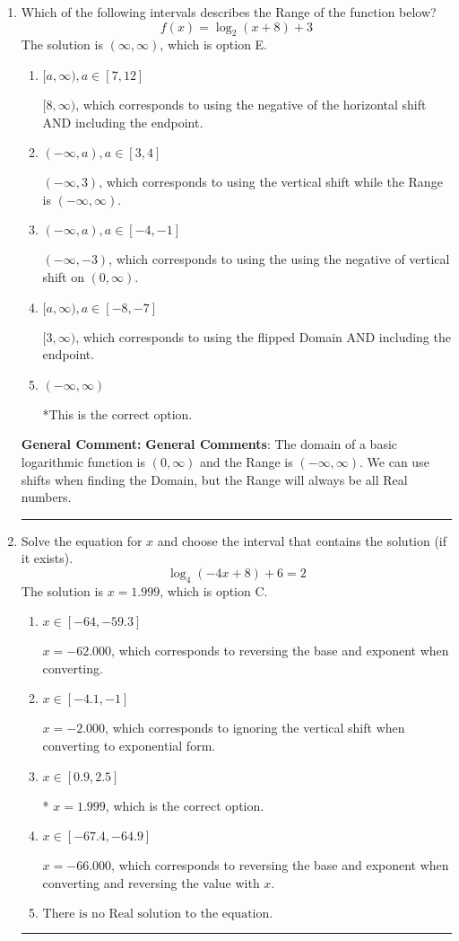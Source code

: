 \documentclass{extbook}[14pt]
\newcommand{\litem}[1]{\item #1

\rule{\textwidth}{0.4pt}}
\begin{document}
\begin{enumerate}\litem{
Which of the following intervals describes the Range of the function below?
\[ f(x) = \log_2{(x+8)}+3 \]The solution is \( (\infty, \infty) \), which is option E.\begin{enumerate}[label=\Alph*.]
\item \( [a, \infty), a \in [7, 12] \)

$[8, \infty)$, which corresponds to using the negative of the horizontal shift AND including the endpoint.
\item \( (-\infty, a), a \in [3, 4] \)

$(-\infty, 3)$, which corresponds to using the vertical shift while the Range is $(-\infty, \infty)$.
\item \( (-\infty, a), a \in [-4, -1] \)

$(-\infty, -3)$, which corresponds to using the using the negative of vertical shift on $(0, \infty)$.
\item \( [a, \infty), a \in [-8, -7] \)

$[3, \infty)$, which corresponds to using the flipped Domain AND including the endpoint.
\item \( (-\infty, \infty) \)

*This is the correct option.
\end{enumerate}

\textbf{General Comment:} \textbf{General Comments}: The domain of a basic logarithmic function is $(0, \infty)$ and the Range is $(-\infty, \infty)$. We can use shifts when finding the Domain, but the Range will always be all Real numbers.
}
\litem{
Solve the equation for $x$ and choose the interval that contains the solution (if it exists).
\[ \log_{4}{(-4x+8)}+6 = 2 \]The solution is \( x = 1.999 \), which is option C.\begin{enumerate}[label=\Alph*.]
\item \( x \in [-64, -59.3] \)

$x = -62.000$, which corresponds to reversing the base and exponent when converting.
\item \( x \in [-4.1, -1] \)

$x = -2.000$, which corresponds to ignoring the vertical shift when converting to exponential form.
\item \( x \in [0.9, 2.5] \)

* $x = 1.999$, which is the correct option.
\item \( x \in [-67.4, -64.9] \)

$x = -66.000$, which corresponds to reversing the base and exponent when converting and reversing the value with $x$.
\item \( \text{There is no Real solution to the equation.} \)


\end{enumerate}}
\end{enumerate}
\end{document}
